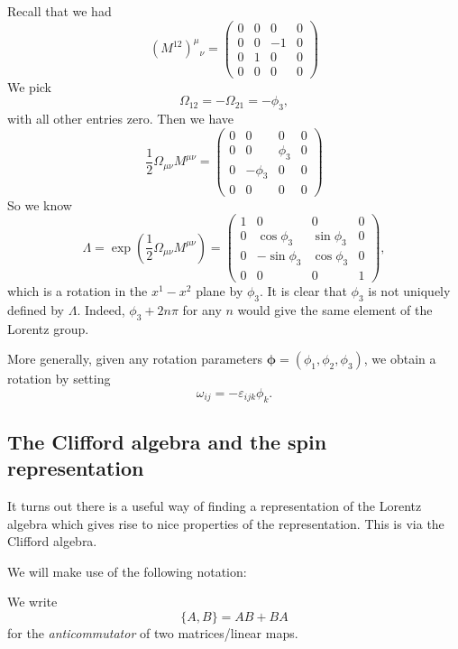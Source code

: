 \documentclass[a4paper]{article}
\begin{document}
\begin{eg}
  Recall that we had
  \[
    (M^{12})^\mu\!_\nu =
    \begin{pmatrix}
      0 & 0 & 0 & 0\\
      0 & 0 & -1 & 0\\
      0 & 1 & 0 & 0\\
      0 & 0 & 0 & 0
    \end{pmatrix}
  \]
  We pick
  \[
    \Omega_{12} = -\Omega_{21} = -\phi_3,
  \]
  with all other entries zero. Then we have
  \[
    \frac{1}{2}\Omega_{\mu\nu} M^{\mu\nu} =
    \begin{pmatrix}
      0 & 0 & 0 & 0\\
      0 & 0 & \phi_3 & 0\\
      0 & -\phi_3 & 0 & 0\\
      0 & 0 & 0 & 0
    \end{pmatrix}
  \]
  So we know
  \[
    \Lambda = \exp\left(\frac{1}{2}\Omega_{\mu\nu} M^{\mu\nu}\right) =
    \begin{pmatrix}
      1 & 0 & 0 & 0\\
      0 & \cos \phi_3 & \sin \phi_3 & 0\\
      0 & -\sin \phi_3 & \cos \phi_3 & 0\\
      0 & 0 & 0 & 1
    \end{pmatrix},
  \]
  which is a rotation in the $x^1-x^2$ plane by $\phi_3$. It is clear that $\phi_3$ is not uniquely defined by $\Lambda$. Indeed, $\phi_3 + 2n \pi$ for any $n$ would give the same element of the Lorentz group.

  More generally, given any rotation parameters $\boldsymbol\phi = (\phi_1, \phi_2, \phi_3)$, we obtain a rotation by setting
  \[
    \omega_{ij} = - \varepsilon_{ijk} \phi_k.
  \]
\end{eg}

\subsection{The Clifford algebra and the spin representation}
It turns out there is a useful way of finding a representation of the Lorentz algebra which gives rise to nice properties of the representation. This is via the Clifford algebra.

We will make use of the following notation:
\begin{notation}[Anticommutator]
  We write
  \[
    \{A, B\} = AB + BA
  \]
  for the \emph{anticommutator} of two matrices/linear maps.
\end{notation}
\end{document}
